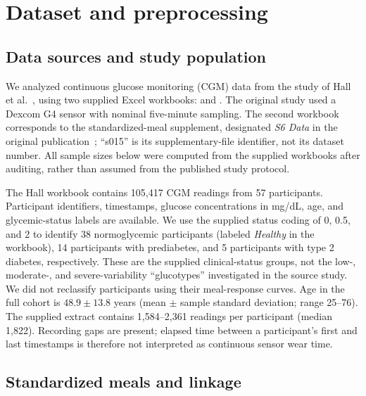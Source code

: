 
\section{Dataset and preprocessing}
\label{sec:dataset}

\subsection{Data sources and study population}

We analyzed continuous glucose monitoring (CGM) data from the study of
Hall et al.~\cite{hall2018glucotypes}, using two supplied Excel workbooks:
 and
. The original study used a Dexcom G4 sensor
with nominal five-minute sampling. The second workbook corresponds to the
standardized-meal supplement, designated \emph{S6 Data} in the original
publication~\cite{hall2018mealdata}; ``s015'' is its supplementary-file
identifier, not its dataset number. All sample sizes below were computed
from the supplied workbooks after auditing, rather than assumed from the
published study protocol.

The Hall workbook contains 105,417 CGM readings from 57 participants.
Participant identifiers, timestamps, glucose concentrations in mg/dL, age,
and glycemic-status labels are available. We use the supplied status coding
of 0, 0.5, and 2 to identify 38 normoglycemic participants (labeled
\emph{Healthy} in the workbook), 14 participants with prediabetes, and
5 participants with type 2 diabetes, respectively. These are the supplied
clinical-status groups, not the low-, moderate-, and severe-variability
``glucotypes'' investigated in the source study. We did not reclassify
participants using their meal-response curves. Age in the full cohort is
$48.9\pm13.8$ years (mean $\pm$ sample standard deviation; range 25--76).
The supplied extract contains 1,584--2,361 readings per participant
(median 1,822). Recording gaps are present; elapsed time between a
participant's first and last timestamps is therefore not interpreted as
continuous sensor wear time.

\subsection{Standardized meals and linkage}

